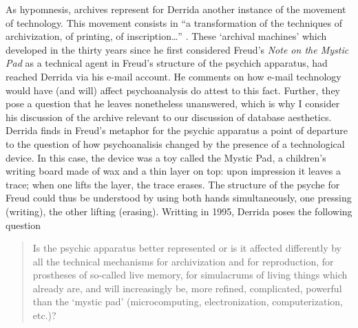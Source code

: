 As hypomnesis, archives represent for Derrida another instance of the movement of technology. This movement consists in ``a transformation of the techniques of archivization, of printing, of inscription\dots'' \parencite[16]{Der95:Arc}. These `archival machines' which developed in the thirty years since he first considered Freud's \textit{Note on the Mystic Pad} as a technical agent in Freud's structure of the psychich apparatus, had reached Derrida via his e-mail account. He comments on how e-mail technology would have (and will) affect psychoanalysis do attest to this fact. Further, they pose a question that he leaves nonetheless unanswered, which is why I consider his discussion of the archive relevant to our discussion of database aesthetics. Derrida finds in Freud's metaphor for the psychic apparatus a point of departure to the question of how psychoanalisis changed by the presence of a technological device. In this case, the device was a toy called the Mystic Pad, a children's writing board made of wax and a thin layer on top: upon impression it leaves a trace; when one lifts the layer, the trace erases. The structure of the psyche for Freud could thus be understood by using both hands simultaneously, one pressing (writing), the other lifting (erasing). Writting in 1995, Derrida poses the following question

\begin{quote}
	Is the psychic apparatus better represented or is it affected differently by all the technical mechanisms for archivization and for reproduction, for prostheses of so-called live memory, for simulacrums of living things which already are, and will increasingly be, more refined, complicated, powerful than the `mystic pad' (microcomputing, electronization, computerization, etc.)? \parencite[16]{Der95:Arc} 
\end{quote}


